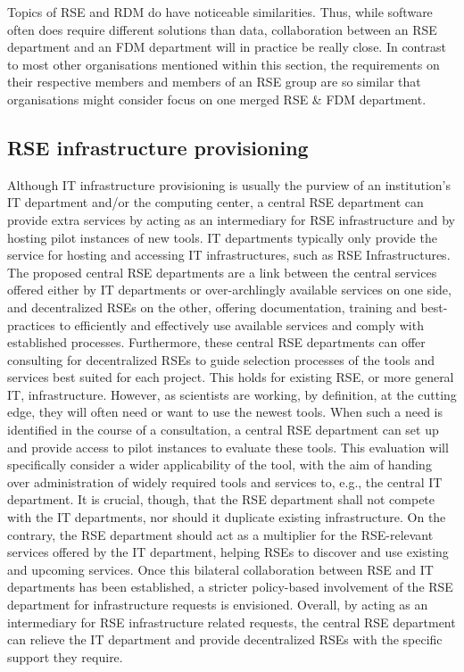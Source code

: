 \documentclass{article}
\begin{document}
Topics of RSE and RDM do have noticeable similarities.
Thus, while software often does require different solutions than data, collaboration between an RSE department and an FDM department will in practice be really close.
In contrast to most other organisations mentioned within this section, the requirements on their respective members and members of an RSE group are so similar that organisations might consider focus on one merged RSE \& FDM department.

\subsection{RSE infrastructure provisioning}

Although IT infrastructure provisioning is usually the purview of an institution's IT department and/or the computing center, a central RSE department can provide extra services by acting as an intermediary for RSE infrastructure and by hosting pilot instances of new tools.
IT departments typically only provide the service for hosting and accessing IT infrastructures, such as RSE Infrastructures.
The proposed central RSE departments are a link between the central services offered either by IT departments or over-archlingly available services on one side, and decentralized RSEs on the other, offering documentation, training and best-practices to efficiently and effectively use available services and comply with established processes.
Furthermore, these central RSE departments can offer consulting for decentralized RSEs to guide selection processes of the tools and services best suited for each project.
This holds for existing RSE, or more general IT, infrastructure.
However, as scientists are working, by definition, at the cutting edge, they will often need or want to use the newest tools.
When such a need is identified in the course of a consultation, a central RSE department can set up and provide access to pilot instances to evaluate these tools.
This evaluation will specifically consider a wider applicability of the tool, with the aim of handing over administration of widely required tools and services to, e.g., the central IT department.
It is crucial, though, that the RSE department shall not compete with the IT departments, nor should it duplicate existing infrastructure.
On the contrary, the RSE department should act as a multiplier for the RSE-relevant services offered by the IT department, helping RSEs to discover and use existing and upcoming services.
Once this bilateral collaboration between RSE and IT departments has been established, a stricter policy-based involvement of the RSE department for infrastructure requests is envisioned.
Overall, by acting as an intermediary for RSE infrastructure related requests, the central RSE department can relieve the IT department and provide decentralized RSEs with the specific support they require.
\end{document}
